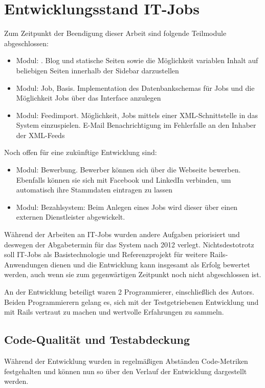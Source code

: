 \section{Entwicklungsstand IT-Jobs}
Zum Zeitpunkt der Beendigung dieser Arbeit sind folgende Teilmodule abgeschlossen:
\begin{itemize}
 \item Modul: . Blog und statische Seiten sowie die Möglichkeit variablen Inhalt auf beliebigen Seiten innerhalb der Sidebar darzustellen
 \item Modul: Job, Basis. Implementation des Datenbankschemas für Jobs und die Möglichkeit Jobs über das Interface anzulegen
 \item Modul: Feedimport. Möglichkeit, Jobs mittels einer XML-Schnittstelle in das System einzuspielen. E-Mail Benachrichtigung im Fehlerfalle an den Inhaber der XML-Feeds
\end{itemize}
Noch offen für eine zukünftige Entwicklung sind:
\begin{itemize}
 \item Modul: Bewerbung. Bewerber können sich über die Webseite bewerben. Ebenfalls können sie sich mit Facebook und LinkedIn verbinden, um automatisch ihre Stammdaten eintragen zu lassen
 \item Modul: Bezahlsystem: Beim Anlegen eines Jobs wird dieser über einen externen Dienstleister abgewickelt.
\end{itemize}

Während der Arbeiten an IT-Jobs wurden andere Aufgaben priorisiert und deswegen der Abgabetermin für das System nach 2012 verlegt. Nichtsdestotrotz soll IT-Jobs als Basistechnologie und Referenzprojekt für weitere Rails-Anwendungen dienen und die Entwicklung kann insgesamt als Erfolg bewertet werden, auch wenn sie zum gegenwärtigen Zeitpunkt noch nicht abgeschlossen ist.

An der Entwicklung beteiligt waren 2 Programmierer, einschließlich des Autors. Beiden Programmierern gelang es, sich mit der Testgetriebenen Entwicklung und mit Rails vertraut zu machen und wertvolle Erfahrungen zu sammeln.

\subsection*{Code-Qualität und Testabdeckung}
Während der Entwicklung wurden in regelmäßigen Abständen Code-Metriken festgehalten und können nun so über den Verlauf der Entwicklung dargestellt werden.

